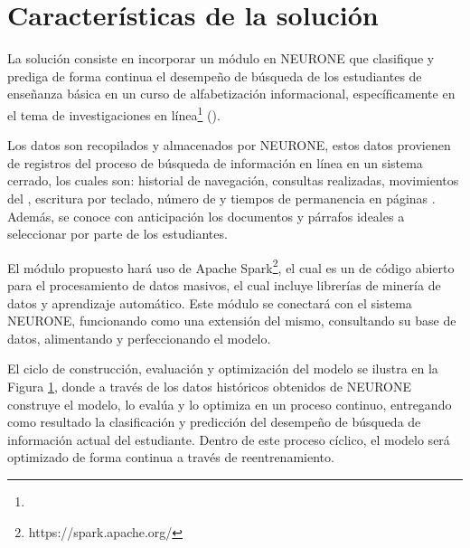 \section{Características de la solución}
\label{sec:caracteristicas-solucion}
La solución consiste en incorporar un módulo en NEURONE \parencite{gonzalez2017neurone} que clasifique y prediga de forma continua el desempeño de búsqueda de los estudiantes de enseñanza básica en un curso de alfabetización informacional, específicamente en el tema de investigaciones en línea\footnote{\traduccionlibre} (). 

Los datos son recopilados y almacenados por NEURONE, estos datos provienen de registros del proceso de búsqueda de información en línea en un sistema cerrado, los cuales son: historial de navegación, consultas realizadas, movimientos del , escritura por teclado, número de  y tiempos de permanencia en páginas . Además, se conoce con anticipación los documentos y párrafos ideales a seleccionar por parte de los estudiantes.

El módulo propuesto hará uso de Apache Spark\footnote{https://spark.apache.org/}, el cual es un  de código abierto para el procesamiento de datos masivos, el cual incluye librerías de minería de datos y aprendizaje automático. Este módulo se conectará con el sistema NEURONE, funcionando como una extensión del mismo, consultando su base de datos, alimentando y perfeccionando el modelo. 

El ciclo de construcción, evaluación y optimización del modelo se ilustra en la Figura \ref{fig:ml-pipeline}, donde a través de los datos históricos obtenidos de NEURONE construye el modelo, lo evalúa y lo optimiza en un proceso continuo, entregando como resultado la clasificación y predicción del desempeño de búsqueda de información actual del estudiante. Dentro de este proceso cíclico, el modelo será optimizado de forma continua a través de reentrenamiento.

\begin{figure}[H]
	\centering
	\scalebox{0.8}{}
	\label{fig:ml-pipeline}
\end{figure}

